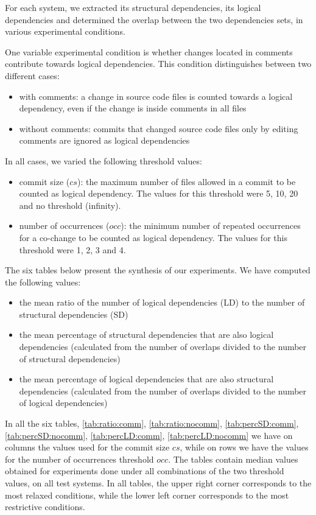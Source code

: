\documentclass[a4paper,twoside]{article}
\begin{document}
For each system, we extracted its structural dependencies, its logical dependencies and determined the overlap between the two dependencies sets, in various experimental conditions. 

One variable experimental condition is whether changes located in comments contribute towards logical dependencies. This condition distinguishes between two different cases: 
\begin{itemize}
	\item with comments: a change in source code files is counted towards a logical dependency, even if the change is inside comments in all files
	\item without comments: commits that changed source code files only by editing comments are ignored as logical dependencies
\end{itemize}

In all cases, we varied the following threshold values: 
 \begin{itemize}
	\item commit size ($cs$): the maximum number of files allowed in a commit to be counted as logical dependency. The values for this threshold were 5, 10, 20 and no threshold (infinity).  
	\item number of occurrences ($occ$): the minimum number of repeated occurrences for a co-change to be counted as logical dependency. The values for this threshold were 1, 2, 3 and 4.  
\end{itemize}

The six tables below present the synthesis of our experiments. 
We have computed the following  values:
\begin{itemize}
	\item the mean ratio of the number of logical dependencies  (LD) to the number of structural dependencies (SD)
   \item the mean percentage of structural dependencies that are also logical dependencies (calculated from the number of overlaps divided to the number of structural dependencies)	
		\item the mean percentage of logical dependencies that are also structural dependencies (calculated from the number of overlaps divided to the number of logical dependencies)
\end{itemize}

In all the six tables, \ref{tab:ratio:comm}, \ref{tab:ratio:nocomm}, \ref{tab:percSD:comm}, \ref{tab:percSD:nocomm},
\ref{tab:percLD:comm}, \ref{tab:percLD:nocomm} we have on columns the values used for the commit size $cs$, while on rows we have the values for the number of occurrences threshold $occ$. The tables contain median values obtained for experiments done under all combinations of the two threshold values, on all test systems. In all tables, the upper right corner corresponds to the most relaxed conditions, while the lower left corner corresponds to the most restrictive conditions.
\end{document}
